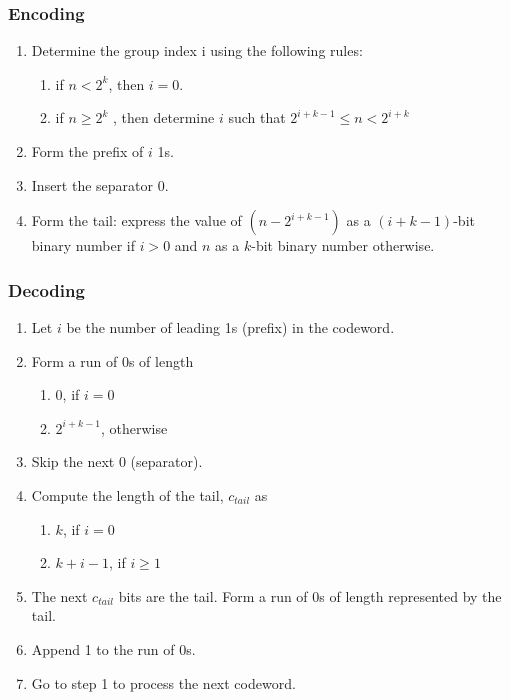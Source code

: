\documentclass[a4paper]{article}
\begin{document}
\subsubsection*{Encoding}

\begin{enumerate}
\item Determine the group index i using the following rules: 

\begin{enumerate}
\item if $n < 2^{k}$, then $i = 0$. 

\item if $n \ge 2^{k}$ , then determine $i$ such that $2^{i+k-1} \le n < 2^{i+k}$
\end{enumerate}

\item Form the prefix of $i$ 1s.

\item Insert the separator 0.

\item Form the tail: express the value of $(n - 2^{i+k-1})$ as a 
$(i + k - 1)$-bit binary number if $i > 0$ and $n$ as a $k$-bit binary number 
otherwise.
\end{enumerate}

\subsubsection*{Decoding}

\begin{enumerate}
\item Let $i$ be the number of leading 1s (prefix) in the codeword.

\item Form a run of 0s of length

\begin{enumerate}
\item $0$, if $i = 0$

\item $2^{i+k-1}$, otherwise
\end{enumerate}

\item Skip the next 0 (separator).

\item Compute the length of the tail, $c_{tail}$ as

\begin{enumerate}
\item $k$, if $i = 0$

\item $k + i - 1$, if $i \ge 1$
\end{enumerate}

\item The next $c_{tail}$ bits are the tail. Form a run of 0s of length 
represented by the tail.

\item Append 1 to the run of 0s.

\item Go to step 1 to process the next codeword.
\end{enumerate}
\end{document}
